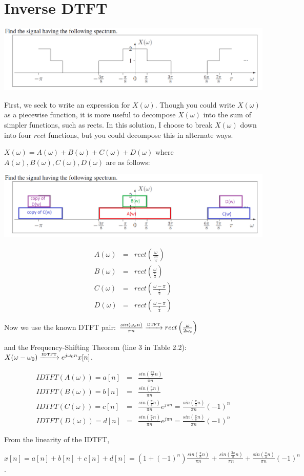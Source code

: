 \documentclass[11pt]{article}
\begin{document}
\section{Inverse DTFT}
\includegraphics[width = \textwidth]{fessler_hmwk5_p9.png}

{\color{blue}
First, we seek to write an expression for $X(\omega)$. Though you could write $X(\omega)$ as a piecewise function, it is more useful to decompose $X(\omega)$ into the sum of simpler functions, such as rects. In this solution, I choose to break $X(\omega)$ down into four $rect$ functions, but you could decompose this in alternate ways.

$X(\omega) = A(\omega)+B(\omega)+C(\omega)+D(\omega)$ where $A(\omega), B(\omega), C(\omega), D(\omega)$ are as follows:

\includegraphics[width = \textwidth]{fessler_hmwk5_p9_annotated.png}

\begin{eqnarray*}
A(\omega) &=& rect\left( \frac{\omega}{\frac{3 \pi} {4} } \right)\\
B(\omega) &=& rect\left( \frac{\omega}{\frac{\pi} {4} } \right)\\
C(\omega) &=& rect\left( \frac{\omega - \pi}{\frac{\pi} {2} } \right)\\
D(\omega) &=& rect\left( \frac{\omega - \pi}{\frac{\pi} {4} } \right)
\end{eqnarray*}

Now we use the known DTFT pair:
$\frac{sin(\omega_c n)}{\pi n} \xrightarrow{\mbox{\tiny{DTFT}}}  rect\left(\frac{\omega}{2 \omega_c} \right)$

and the Frequency-Shifting Theorem (line 3 in Table 2.2):
$X(\omega-\omega_0) \xrightarrow{\mbox{\tiny{IDTFT}}} e^{j\omega_0 n} x[n]$.

\begin{eqnarray*}
IDTFT(A(\omega)) = a[n] &=& \frac{sin\left(\frac{3 \pi}{8}n\right)}{\pi n}\\
IDTFT(B(\omega)) = b[n] &=& \frac{sin\left(\frac{\pi}{8}n\right)}{\pi n}\\
IDTFT(C(\omega)) = c[n] &=& \frac{sin\left(\frac{\pi}{4}n\right)}{\pi n}e^{j \pi n} =\frac{sin\left(\frac{\pi}{4}n\right)}{\pi n}(-1)^{n}\\
IDTFT(D(\omega)) = d[n] &=& \frac{sin\left(\frac{\pi}{8}n\right)}{\pi n}e^{j \pi n} = \frac{sin\left(\frac{\pi}{8}n\right)}{\pi n}(-1)^{n}
\end{eqnarray*}

From the linearity of the IDTFT, 

$x[n] = a[n]+b[n]+c[n]+d[n] = (1 + (-1)^n)  \frac{sin\left(\frac{\pi}{8}n\right)}{\pi n} + \frac{sin\left(\frac{3 \pi}{8}n\right)}{\pi n} + \frac{sin\left(\frac{\pi}{4}n\right)}{\pi n}(-1)^{n}$. 

}
\end{document}
